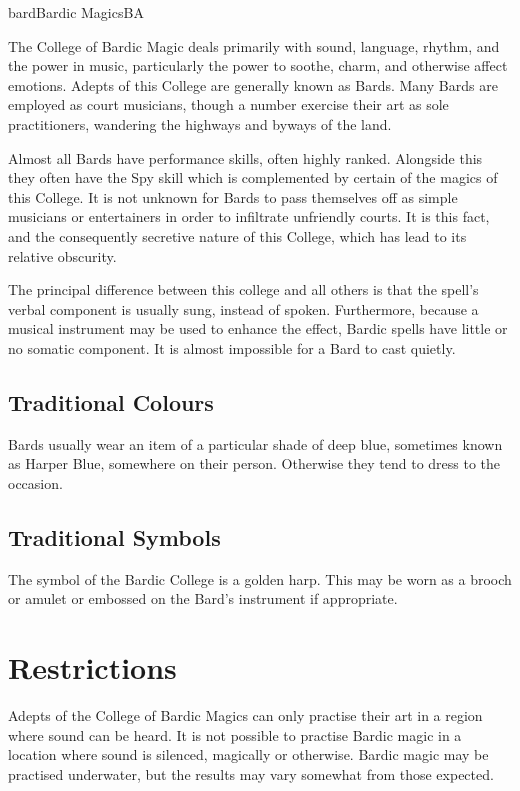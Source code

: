 \begin{College}[2.1]{bard}{Bardic Magics}{BA}

The College of Bardic Magic deals primarily with sound, language,
rhythm, and the power in music, particularly the power to soothe,
charm, and otherwise affect emotions.  Adepts of this College are
generally known as Bards.  Many Bards are employed as court musicians,
though a number exercise their art as sole practitioners, wandering
the highways and byways of the land.

Almost all Bards have performance skills, often highly ranked.
Alongside this they often have the Spy skill which is complemented by
certain of the magics of this College. It is not unknown for Bards to
pass themselves off as simple musicians or entertainers in order to
infiltrate unfriendly courts.  It is this fact, and the consequently
secretive nature of this College, which has lead to its relative
obscurity.

The principal difference between this college and all others is that
the spell’s verbal component is usually sung, instead of spoken.
Furthermore, because a musical instrument may be used to enhance the
effect, Bardic spells have little or no somatic component.  It is
almost impossible for a Bard to cast quietly.

\subsection{Traditional Colours}

Bards usually wear an item of a particular shade of deep blue,
sometimes known as Harper Blue, somewhere on their person. Otherwise
they tend to dress to the occasion.

\subsection{Traditional Symbols}

The symbol of the Bardic College is a golden harp.  This may be worn
as a brooch or amulet or embossed on the Bard’s instrument if
appropriate.

\section{Restrictions}

Adepts of the College of Bardic Magics can only practise their art in
a region where sound can be heard. It is not possible to practise
Bardic magic in a location where sound is silenced, magically or
otherwise.  Bardic magic may be practised underwater, but the results
may vary somewhat from those expected.


\end{College}
